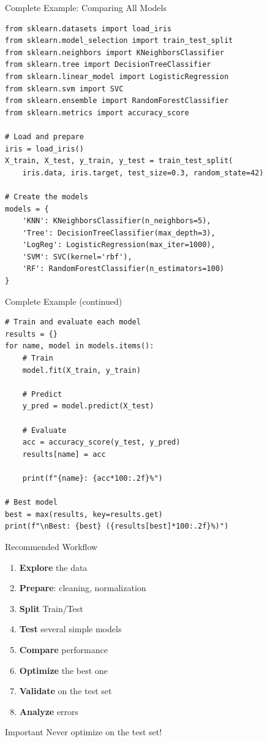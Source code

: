 \documentclass[aspectratio=169]{beamer}
\begin{document}
\begin{frame}[fragile]{Complete Example: Comparing All Models}
\begin{lstlisting}
from sklearn.datasets import load_iris
from sklearn.model_selection import train_test_split
from sklearn.neighbors import KNeighborsClassifier
from sklearn.tree import DecisionTreeClassifier
from sklearn.linear_model import LogisticRegression
from sklearn.svm import SVC
from sklearn.ensemble import RandomForestClassifier
from sklearn.metrics import accuracy_score

# Load and prepare
iris = load_iris()
X_train, X_test, y_train, y_test = train_test_split(
    iris.data, iris.target, test_size=0.3, random_state=42)

# Create the models
models = {
    'KNN': KNeighborsClassifier(n_neighbors=5),
    'Tree': DecisionTreeClassifier(max_depth=3),
    'LogReg': LogisticRegression(max_iter=1000),
    'SVM': SVC(kernel='rbf'),
    'RF': RandomForestClassifier(n_estimators=100)
}
\end{lstlisting}
\end{frame}

\begin{frame}[fragile]{Complete Example (continued)}
\begin{lstlisting}
# Train and evaluate each model
results = {}
for name, model in models.items():
    # Train
    model.fit(X_train, y_train)
    
    # Predict
    y_pred = model.predict(X_test)
    
    # Evaluate
    acc = accuracy_score(y_test, y_pred)
    results[name] = acc
    
    print(f"{name}: {acc*100:.2f}%")

# Best model
best = max(results, key=results.get)
print(f"\nBest: {best} ({results[best]*100:.2f}%)")
\end{lstlisting}
\end{frame}

\begin{frame}{Recommended Workflow}
\begin{enumerate}
    \item \textbf{Explore} the data
    \item \textbf{Prepare}: cleaning, normalization
    \item \textbf{Split} Train/Test
    \item \textbf{Test} several simple models
    \item \textbf{Compare} performance
    \item \textbf{Optimize} the best one
    \item \textbf{Validate} on the test set
    \item \textbf{Analyze} errors
\end{enumerate}

\vspace{0.5cm}
\begin{alertblock}{Important}
Never optimize on the test set!
\end{alertblock}
\end{frame}
\end{document}

